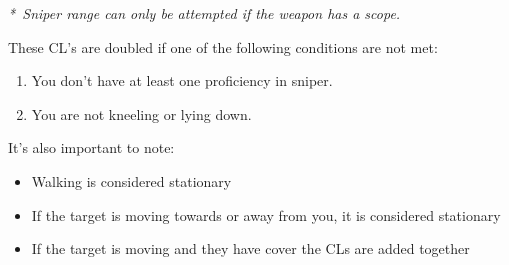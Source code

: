 \textit{*~Sniper range can only be attempted if the weapon has a scope.}

These CL’s are doubled if one of the following conditions are not met:

\begin{enumerate}
    \item You don’t have at least one proficiency in sniper.
    \item You are not kneeling or lying down.
\end{enumerate}

It's also important to note:

\begin{itemize}
    \item Walking is considered stationary
    \item If the target is moving towards or away from you, it is considered stationary
    \item If the target is moving and they have cover the CLs are added together
\end{itemize}